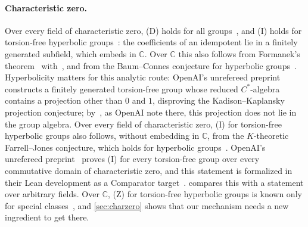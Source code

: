 \documentclass[11pt]{article}
\theoremstyle{definition}
\theoremstyle{plain}
\newcommand{\C}{\mathbb{C}}
\begin{document}
\paragraph{Characteristic zero.} Over every field of characteristic zero, (D) holds for all groups~\cite{Kaplansky1972,Montgomery1969}, and (I) holds for torsion-free hyperbolic groups~\cite{Puschnigg2002}: the coefficients of an idempotent lie in a finitely generated subfield, which embeds in $\C$. Over $\C$ this also follows from Formanek's theorem~\cite[Thm.~9]{Formanek1973} with~\cite[Remark~4.3]{BurgerValette1998}, and from the Baum--Connes conjecture for hyperbolic groups~\cite{MineyevYu2002,Lafforgue2002}. Hyperbolicity matters for this analytic route: OpenAI's unrefereed preprint~\cite[Thm.~1.1]{OAI285} constructs a finitely generated torsion-free group whose reduced $C^*$-algebra contains a projection other than $0$ and $1$, disproving the Kadison--Kaplansky projection conjecture; by~\cite[Cor.~1.2(ii)]{OAI207}, as OpenAI note there, this projection does not lie in the group algebra. Over every field of characteristic zero, (I) for torsion-free hyperbolic groups also follows, without embedding in $\C$, from the $K$-theoretic Farrell--Jones conjecture, which holds for hyperbolic groups~\cite[Thms.~0.1, 0.2 and~0.12(ii)]{BLR2008}. OpenAI's unrefereed preprint~\cite[Cor.~1.2(ii)]{OAI207} proves (I) for every torsion-free group over every commutative domain of characteristic zero, and this statement is formalized in their Lean development as a Comparator target~\cite{OAIlean}.  compares this with a statement over arbitrary fields. Over $\C$, (Z) for torsion-free hyperbolic groups is known only for special classes~\cite{Delzant1997,Schreve2014,AvramidiDelzant2023,FisherSanchezPeralta2026}, and \cref{sec:charzero} shows that our mechanism needs a new ingredient to get there.
\end{document}
